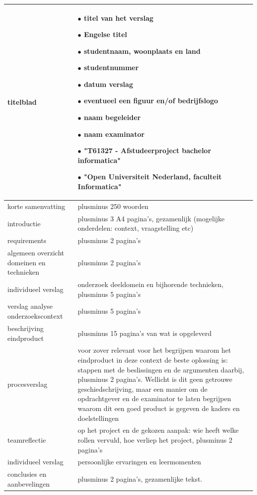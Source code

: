 \begin{center}
\begin{supertabular}{p{7em}|p{23em}}
\hline
 titelblad &  	\par $\bullet$ titel van het verslag
		\par $\bullet$ Engelse titel
		\par $\bullet$ studentnaam, woonplaats en land
		\par $\bullet$ studentnummer
		\par $\bullet$ datum verslag
		\par $\bullet$ eventueel een figuur en/of bedrijfslogo
		\par $\bullet$ naam begeleider
		\par $\bullet$ naam examinator
		\par $\bullet$ "T61327 - Afstudeerproject bachelor informatica"
		\par $\bullet$ "Open Universiteit Nederland, faculteit Informatica"
 \\\hline
 korte samenvatting &  plusminus 250 woorden
 \\\hline
 introductie &  plusminus 3 A4 pagina's, gezamenlijk (mogelijke onderdelen:
context, vraagstelling etc)
 \\\hline
 requirements & plusminus 2 pagina's
 \\\hline
 algemeen overzicht domeinen en technieken & plusminus 2 pagina's
 \\\hline
    individueel verslag & onderzoek deeldomein en bijhorende technieken, plusminus
			5 pagina's
 \\\hline
    verslag analyse onderzoekscontext & plusminus 5 pagina's
 \\\hline
    beschrijving eindproduct & plusminus 15 pagina’s van wat is opgeleverd
 \\\hline
    procesverslag & voor zover relevant voor het begrijpen waarom het eindproduct
		in deze context de beste oplossing is: stappen met de beslissingen en de
		argumenten daarbij, plusminus 2 pagina's. Wellicht is dit geen getrouwe
		geschiedschrijving, maar een manier om de opdrachtgever en de examinator te
		laten begrijpen waarom dit een goed product is gegeven de kaders en
		doelstellingen
 \\\hline
    teamreflectie & op het project en de gekozen aanpak: wie heeft welke rollen
		    vervuld, hoe verliep het project, plusminus 2 pagina's
 \\\hline
    individueel verslag & persoonlijke ervaringen en leermomenten
 \\\hline
    conclusies en aanbevelingen & plusminus 2 pagina's, gezamenlijke tekst.
 \\\hline
\end{supertabular}
\end{center}

